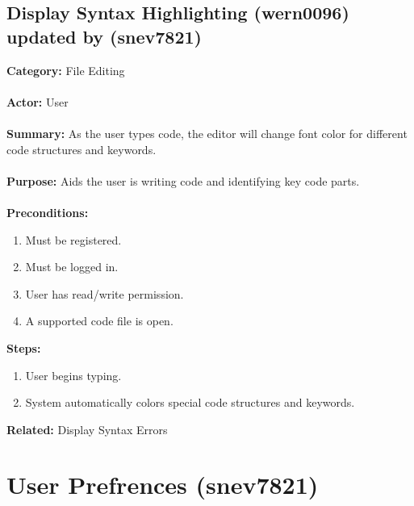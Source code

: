 \documentclass[11pt]{report}
\begin{document}
\subsection{Display Syntax Highlighting (wern0096) updated by (snev7821)}
\begin{framed}

	\textbf{Category:} File Editing \\ \\
	\textbf{Actor:} User \\ \\
	\textbf{Summary:} As the user types code, the editor will change font color for different code structures and keywords. \\ \\
	\textbf{Purpose:} Aids the user is writing code and identifying key code parts. \\ \\
	\textbf{Preconditions:} 
	\begin{enumerate}
		\item Must be registered.
		\item Must be logged in.
		\item User has read/write permission.
		\item A supported code file is open.
	\end{enumerate}
	\textbf{Steps:}
	\begin{enumerate}
		\item User begins typing.
		\item System automatically colors special code structures and keywords.
	\end{enumerate}
	\textbf{Related:} Display Syntax Errors
\end{framed}

\newpage

\section{User Prefrences (snev7821)}
\end{document}
